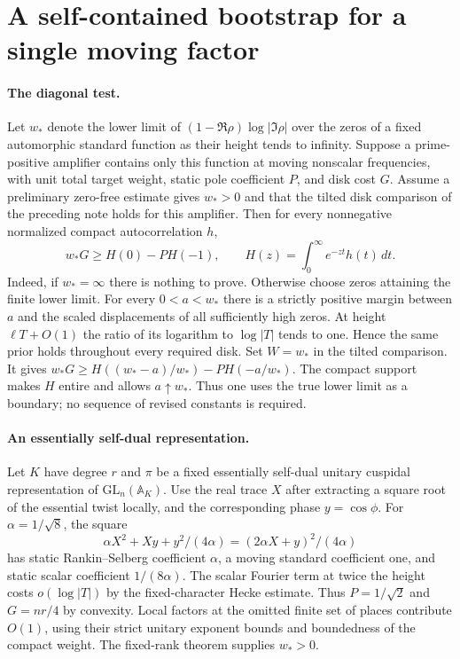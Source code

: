 \section{A self-contained bootstrap for a single moving factor}
\label{sec:diagonal-strip}

\paragraph{The diagonal test.}
Let $w_*$ denote the lower limit of $(1-\Re\rho)\log|\Im\rho|$
over the zeros of a fixed automorphic standard function as their height
tends to infinity. Suppose a prime-positive amplifier contains only this
function at moving nonscalar frequencies, with unit total target
weight, static pole coefficient $P$, and disk cost $G$.
Assume a preliminary zero-free estimate gives $w_*>0$ and that the
tilted disk comparison of the preceding note holds for this amplifier.
Then for every nonnegative normalized compact autocorrelation $h$,
\[
       w_* G\ge H(0)-P H(-1),\qquad
       H(z)=\int_0^\infty e^{-zt}h(t)\,dt.
\]
Indeed, if $w_*=\infty$ there is nothing to prove. Otherwise choose
zeros attaining the finite lower limit. For every $0<a<w_*$ there
is a strictly positive margin between $a$ and the scaled displacements
of all sufficiently high zeros. At height $\ell T+O(1)$ the ratio
of its logarithm to $\log|T|$ tends to one. Hence the same prior
holds throughout every required disk. Set $W=w_*$ in the tilted
comparison. It gives
$w_*G\ge H((w_*-a)/w_*)-P H(-a/w_*)$. The compact support makes
$H$ entire and allows $a\uparrow w_*$. Thus one uses the true lower
limit as a boundary; no sequence of revised constants is required.

\paragraph{An essentially self-dual representation.}
Let $K$ have degree $r$ and $\pi$ be a fixed essentially self-dual
unitary cuspidal representation of $\mathrm{GL}_n(\mathbb A_K)$.
Use the real trace $X$ after extracting a square root of the
essential twist locally, and the corresponding phase $y=\cos\phi$.
For $\alpha=1/\sqrt8$, the square
\[
          \alpha X^2+Xy+y^2/(4\alpha)
             =(2\alpha X+y)^2/(4\alpha)
\]
has static Rankin--Selberg coefficient $\alpha$, a moving standard
coefficient one, and static scalar coefficient $1/(8\alpha)$.
The scalar Fourier term at twice the height costs $o(\log|T|)$ by the
fixed-character Hecke estimate. Thus $P=1/\sqrt2$ and $G=nr/4$ by
convexity. Local factors at the omitted finite set of places contribute
$O(1)$, using their strict unitary exponent bounds and boundedness
of the compact weight. The fixed-rank theorem supplies $w_*>0$.

